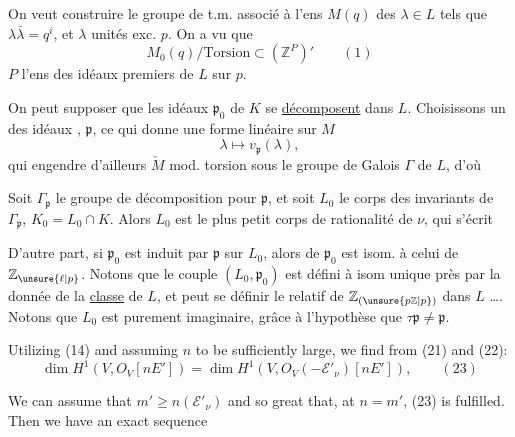 On veut construire le groupe de t.m.  associé à l'ens $M(q)$ des $\lambda\in L$ tels que $\lambda\bar\lambda=q^i$, et $\lambda$ unités exc. $p$. On a vu que
\[
M_0(q)/\text{Torsion}\subset (\mathbb Z^P)' \qquad (1)
\]
$P$ l'ens des idéaux premiers de $L$ sur $p$.

On peut supposer que les idéaux $\mathfrak p_0$ de $K$ se \uline{décomposent} dans $L$. Choisissons un des  idéaux , $\mathfrak p$, ce qui donne une forme linéaire  sur $M$
\[
\lambda\longmapsto v_{\mathfrak p}(\lambda),
\]
qui engendre d'ailleurs $\check M$ mod. torsion sous le groupe de Galois $\Gamma$ de $L$, d'où

Soit $\Gamma_{\mathfrak p}$ le groupe de décomposition pour $\mathfrak p$,   et soit  $L_0$ le corps des invariants de $\Gamma_{\mathfrak p}$, $K_0=L_0\cap K$. Alors $L_0$ est le plus petit corps de rationalité de $\nu$, qui s'écrit 

D'autre part, si $\mathfrak p_0$ est induit par $\mathfrak p$ sur $L_0$, alors   de $\mathfrak p_0$ est  isom. à celui de $\mathbb Z_{\unsure{\ell|p}}$. Notons que le couple $(L_0,\mathfrak p_0)$ est défini à isom unique près par la donnée de la \uline{classe} de $L$, et peut se définir   le  relatif de $\mathbb Z_{(\unsure{p\mathbb Z|p})}$ dans $L$ \dots. Notons que $L_0$ est purement imaginaire, grâce à l'hypothèse que $\tau\mathfrak p\ne\mathfrak p$.

Utilizing (14) and assuming $n$ to be sufficiently large, we find from (21) and (22):
\[
\dim H^1(V,O_V[nE'])=\dim H^1(V,O_V(-\mathcal E'_\nu)[nE']),\qquad (23)
\]

We can assume that $m'\ge n(\mathcal E'_\nu)$ and so great that, at $n=m'$, (23) is fulfilled. Then we have an exact sequence

